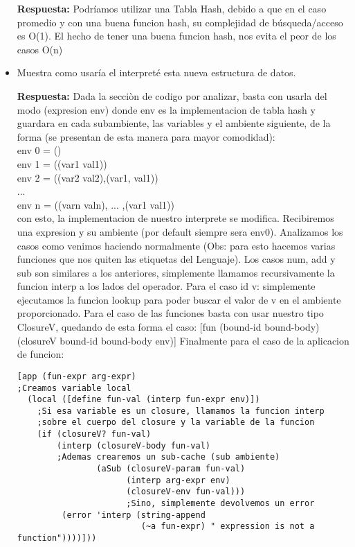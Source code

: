 \documentclass[letterpaper,11pt]{article}
\begin{document}
\begin{itemize}
  \textbf{Respuesta: }
    Podríamos utilizar una Tabla Hash, debido a que en el caso promedio y con una buena funcion hash, su complejidad de búsqueda/acceso es O(1). El hecho de tener una buena funcion hash, nos evita el peor de los casos O(n)
    
 \item Muestra como usaría el interpreté esta nueva estructura de datos.
 
  \textbf{Respuesta: }
    Dada la secciòn de codigo por analizar, basta con usarla del modo (expresion env) donde env es la implementacion de tabla hash  y guardara en cada
    subambiente, las variables y el ambiente siguiente, de la forma (se presentan de esta manera para mayor comodidad): 
    \\
    env 0 = ()
    \\
    env 1 = ((var1 val1))
    \\
    env 2 = ((var2 val2),(var1, val1))
    \\
    ...
    \\
    env n = ((varn valn), ... ,(var1 val1))  
    \\
    con esto, la implementacion de nuestro interprete se modifica. Recibiremos una expresion y su ambiente (por default siempre sera env0). Analizamos los casos como venimos haciendo normalmente
    (Obs: para esto hacemos varias funciones que nos quiten las etiquetas del Lenguaje). Los casos num, add y sub son similares a los anteriores, simplemente llamamos recursivamente la funcion interp
    a los lados del operador.
    Para el caso id v: simplemente ejecutamos la funcion lookup para poder buscar el valor de v en el ambiente proporcionado.
    Para el caso de las funciones basta con usar nuestro tipo ClosureV, quedando de esta forma el caso:    [fun (bound-id bound-body) (closureV bound-id bound-body env)]
    Finalmente para el caso de la aplicacion de funcion:
    \begin{verbatim} 
[app (fun-expr arg-expr)
;Creamos variable local
  (local ([define fun-val (interp fun-expr env)])
    ;Si esa variable es un closure, llamamos la funcion interp 
    ;sobre el cuerpo del closure y la variable de la funcion
    (if (closureV? fun-val)
        (interp (closureV-body fun-val)
        ;Ademas crearemos un sub-cache (sub ambiente)
                (aSub (closureV-param fun-val)
                      (interp arg-expr env)
                      (closureV-env fun-val)))
                      ;Sino, simplemente devolvemos un error
         (error 'interp (string-append 
                         (~a fun-expr) " expression is not a function"))))]))   
    

\end{verbatim}
\end{itemize}
\end{document}
